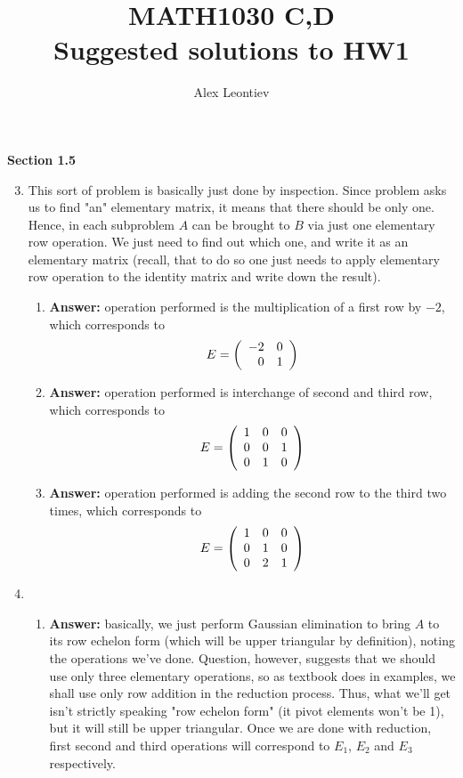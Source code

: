 \documentclass[8pt]{article} %
\title{MATH1030 C,D\\Suggested solutions to HW1}
\author{Alex Leontiev}
\begin{document}
\maketitle
	\renewcommand{\v}{\mathbf{v}}
	\renewcommand{\u}{\mathbf{u}}
	\renewcommand{\i}{\mathbf{i}}
	\renewcommand{\j}{\mathbf{j}}
	\renewcommand{\k}{\mathbf{k}}
	\newcommand{\w}{\mathbf{w}}
\textbf{Section 1.5}
\begin{enumerate}[1]
	\setcounter{enumi}{2}
	\item This sort of problem is basically just done by inspection. Since problem asks us to find "an" elementary matrix,
		it means that there should be only one. Hence, in each subproblem $A$ can be brought to $B$ via just one elementary
		row operation. We just need to find out which one, and write it as an elementary matrix (recall, that to do so
		one just needs to apply elementary row operation to the identity matrix and write down the result).
		\begin{enumerate}[\bf \bf(a)]
			\item {\bf Answer: }operation performed is the multiplication of a first row by $-2$, which corresponds to
				\[E=\left(\begin{array}{rr}-2&0\\0&1\end{array}\right)\]
			\item {\bf Answer: }operation performed is interchange of second and third row, which corresponds to
				\[E=\left(\begin{array}{lll}1&0&0\\0&0&1\\0&1&0\end{array}\right)\]
			\item {\bf Answer: }operation performed is adding the second row to the third two times, which corresponds to
				\[E=\left(\begin{array}{lll}1&0&0\\0&1&0\\0&2&1\end{array}\right)\]
		\end{enumerate}
	\setcounter{enumi}{5}
	\item
		\begin{enumerate}[\bf(a)]
			\item {\bf Answer: }basically, we just perform Gaussian elimination to bring $A$ to its row echelon form
				(which will be upper triangular by definition), noting the operations we've done. Question, however,
				suggests that we should use only three elementary operations, so as textbook does in examples, we
				shall use only row addition in the reduction process. Thus, what we'll get isn't strictly speaking
				"row echelon form" (it pivot elements won't be 1), but it will still be upper triangular. Once
				we are done with reduction, first second and third operations will correspond to $E_1$, $E_2$ and $E_3
				$ respectively.
				

\end{enumerate}
\end{enumerate}
\end{document}
